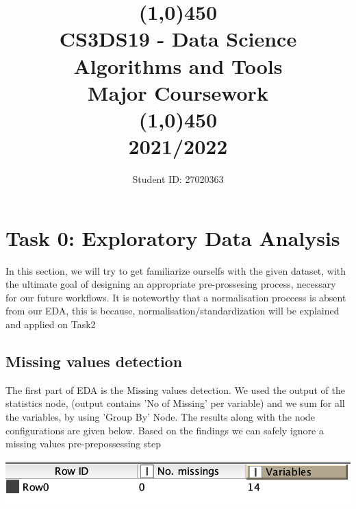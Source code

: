 \documentclass[11pt]{article}
\title{\line(1,0){450}\\ CS3DS19 - Data Science Algorithms and Tools \\ \large{Major Coursework }  \\\line(1,0){450} \\2021/2022}
\author{Student ID: 27020363}
\begin{document}
	\maketitle
	\pagebreak
	
	\section*{Task 0: Exploratory Data Analysis}
		In this section, we will try to get familiarize ourselfs with the given dataset, with the ultimate goal of designing an appropriate pre-prossesing process, necessary for our future workflows. It is noteworthy that a normalisation proccess is absent from our EDA, this is because, normalisation/standardization will be explained and applied on Task2
		\subsection*{Missing values detection}
			The first part of EDA is the Missing values detection. We used the output of the statistics node, (output contains 'No of Missing' per variable) and we sum for all the variables, by using 'Group By' Node. The results along with the node configurations are given below. Based on the findings we can safely ignore a missing values pre-prepossessing step
			\iftrue
			\begin{center}
				\includegraphics[scale=0.5]{res/t0/t01/t01-missing-values-res}
			\end{center}
			\fi
\end{document}
